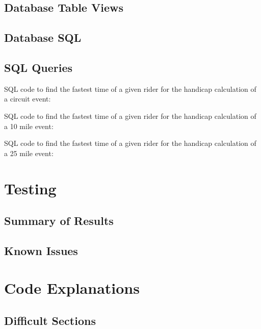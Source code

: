 \subsection{Database Table Views}
\clearpage

\begin{landscape}
\subsection{Database SQL}
\end{landscape}
\subsection{SQL Queries}

SQL code to find the fastest time of a given rider for the handicap calculation of a circuit event:


SQL code to find the fastest time of a given rider for the handicap calculation of a 10 mile event:


SQL code to find the fastest time of a given rider for the handicap calculation of a 25 mile event:


\section{Testing}

\subsection{Summary of Results}

\subsection{Known Issues}

\section{Code Explanations}

\subsection{Difficult Sections}


